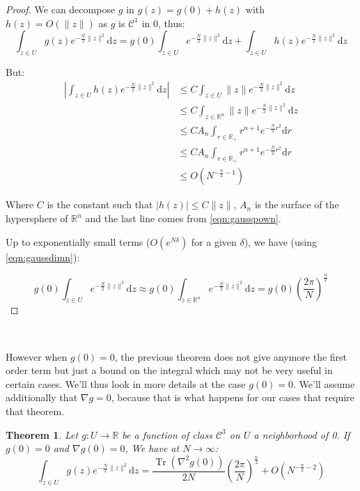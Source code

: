 \documentclass[10pt,a4paper]{report}
\theoremstyle{plain}
\newtheorem{thm}{Theorem}[chapter]
\theoremstyle{definition}
\theoremstyle{remark}
\newcommand{\R}{\ensuremath{\mathbb{R}}}
\newcommand{\dd}{\mathrm{d}}
\renewcommand{\leq}{\leqslant}
\DeclareMathOperator{\Tr}{Tr}
\newcommand{\class}[1]{{\mathscr{C}^{#1}}}
\begin{document}
\begin{proof}

  We can decompose $g$ in $g(z) = g(0) + h(z)$ with $h(z) = O(\|z\|)$ as $g$ is
  $\class{1}$ in 0, thus:
\[\int_{z \in U} g(z)e^{-\frac N2\|z\|^2} \dd z = g(0)\int_{z \in U} e^{-\frac
    N2\|z\|^2} \dd z + \int_{z \in U} h(z)e^{-\frac N2\|z\|^2} \dd z\]

But:
\begin{align*}
  \left |\int_{z \in U} h(z)e^{-\frac N2\|z\|^2} \dd z\right|
  &\leq C \int_{z \in U} \|z\|e^{-\frac N2\|z\|^2} \dd z\\
  &\leq C \int_{z \in \R^n} \|z\|e^{-\frac N2\|z\|^2} \dd z\\
  &\leq CA_n \int_{r \in \R_+} r^{n+1}e^{-\frac N2 r^2} \dd r\\
  &\leq CA_n \int_{r \in \R_+} r^{n+1}e^{-\frac N2 r^2} \dd r\\
  &\leq O\left({N^{-\frac n 2 -1}}\right)
\end{align*}

Where $C$ is the constant such that $|h(z)| \leq C \|z\|$, $A_n$ is the surface
of the hypersphere of $\R^n$ and the last line comes from \cref{eqn:gausspown}.

Up to exponentially small terms ($O(e^{N\delta})$ for a given $\delta$), we have
(using \cref{eqn:gaussdimn}):

\[g(0)\int_{z \in U} e^{-\frac
    N2\|z\|^2} \dd z \approx g(0)\int_{z \in \R^n} e^{-\frac
    N2\|z\|^2} \dd z = g(0) {\left(\frac
      {2\pi}{N}\right)}^{\frac n 2}\]

\end{proof}

\


However when $g(0) = 0$, the previous theorem does not give anymore the first
order term but just a bound on the integral which may not be very useful in
certain cases. We'll thus look in more details at the case $g(0) = 0$. We'll
assume additionally that $\nabla g = 0$, because that is what happens for our
cases that require that theorem.


\begin{thm}\label{thm:asy2}
 Let $g : U \to \R$ be a function of class $\class 3$ on $U$ a neighborhood of 0. If $g(0) = 0$
 and $\nabla g(0) = 0$, We have at $N \to \infty$:
  \[\int_{z \in U} g(z)e^{-\frac N2\|z\|^2} \dd z = \frac{\Tr(\nabla^2 g(0))}{2N} {\left(\frac
        {2\pi}{N}\right)}^{\frac n 2} +
    O\left({N^{-\frac n 2 -2}}\right)\]
\end{thm}
\end{document}
